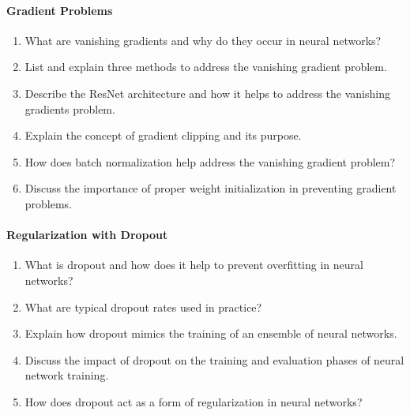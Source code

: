 \paragraph*{Gradient Problems}
\begin{enumerate}
    \item What are vanishing gradients and why do they occur in neural networks?
    \item List and explain three methods to address the vanishing gradient problem.
    \item Describe the ResNet architecture and how it helps to address the vanishing gradients problem.
    \item Explain the concept of gradient clipping and its purpose.
    \item How does batch normalization help address the vanishing gradient problem?
    \item Discuss the importance of proper weight initialization in preventing gradient problems.
\end{enumerate}
\paragraph*{Regularization with Dropout}
\begin{enumerate}
    \item What is dropout and how does it help to prevent overfitting in neural networks?
    \item What are typical dropout rates used in practice?
    \item Explain how dropout mimics the training of an ensemble of neural networks.
    \item Discuss the impact of dropout on the training and evaluation phases of neural network training.
    \item How does dropout act as a form of regularization in neural networks?
\end{enumerate}
